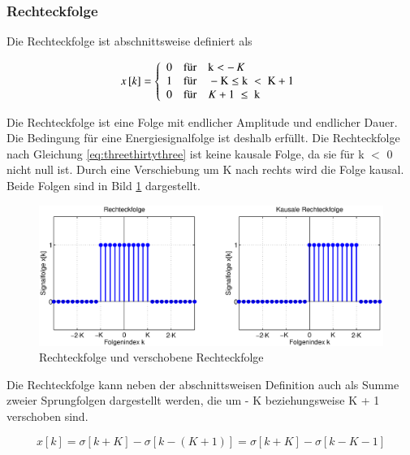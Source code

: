 \subsubsection{Rechteckfolge}

\noindent Die Rechteckfolge ist abschnittsweise definiert als 

\begin{equation}\label{eq:threethirtythree}
x\left[k\right]=\left\{\begin{array}{l} {0\quad \text{für} \quad \text{k}<-\, K} \\ {1\rm \quad \text{für} \quad -K\le \text{k}\rm \;<\rm \;K+1} \\ 
0\quad \text{für}\quad K+1 \rm \;\le \rm \;\text{k} \rm \; \end{array}\right.
\end{equation}

\noindent Die Rechteckfolge ist eine Folge mit endlicher Amplitude und endlicher Dauer. Die Bedingung f\"{u}r eine Energiesignalfolge ist deshalb erf\"{u}llt. Die Rechteckfolge nach Gleichung \eqref{eq:threethirtythree} ist keine kausale Folge, da sie f\"{u}r k $\mathrm{<}$ 0 nicht null ist. Durch eine Verschiebung um K nach rechts wird die Folge kausal. Beide Folgen sind in Bild \ref{fig:Rechteckfolgen} dargestellt.

\begin{figure}[H]
  \centerline{\includegraphics[width=1\textwidth]{Kapitel3/Bilder/image10.eps}}
  \caption{Rechteckfolge und verschobene Rechteckfolge}
  \label{fig:Rechteckfolgen}
\end{figure}

\clearpage

\noindent Die Rechteckfolge kann neben der abschnittsweisen Definition auch als Summe zweier Sprungfolgen dargestellt werden, die um - K beziehungsweise K + 1 verschoben sind.

\begin{equation}\label{eq:threethirtyfour}
x\left[k\right]=\sigma \left[k+K\right]-\sigma \left[k-\left(K+1\right)\right]=\sigma \left[k+K\right]-\sigma \left[k-K-1\right]
\end{equation}

